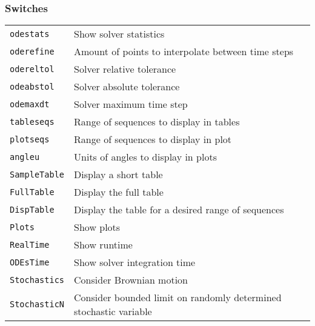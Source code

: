 \documentclass[11pt]{thesis}
\numberwithin{equation}{section}
\begin{document}
\subsubsection*{Switches}
\begin{longtable}[l]{l l}
\texttt{odestats}    & Show solver statistics \\
\texttt{oderefine}   & Amount of points to interpolate between time steps \\
\texttt{odereltol}   & Solver relative tolerance \\
\texttt{odeabstol}   & Solver absolute tolerance \\
\texttt{odemaxdt}    & Solver maximum time step\\
\texttt{tableseqs}   & Range of sequences to display in tables \\
\texttt{plotseqs}    & Range of sequences to display in plot \\
\texttt{angleu}      & Units of angles to display in plots \\
\texttt{SampleTable} & Display a short table \\
\texttt{FullTable}   & Display the full table \\
\texttt{DispTable}   & Display the table for a desired range of sequences \\
\texttt{Plots}       & Show plots \\
\texttt{RealTime}    & Show runtime \\
\texttt{ODEsTime}    & Show solver integration time \\
\texttt{Stochastics} & Consider Brownian motion \\
\texttt{StochasticN} & Consider bounded limit on randomly determined stochastic variable
\end{longtable}
\end{document}
